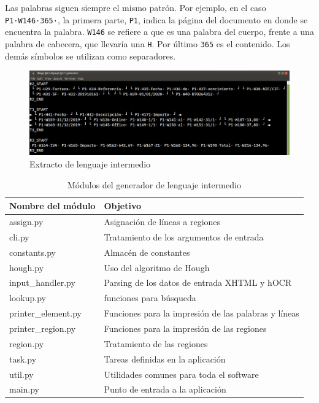 Las palabras siguen siempre el mismo patrón. Por ejemplo, en el caso \verb|P1·W146·365·|, la primera parte, \verb|P1|, indica la página del documento en donde se encuentra la palabra. \verb|W146| se refiere a que es una palabra del cuerpo, frente a una palabra de cabecera, que llevaría una \verb|H|. Por último \verb|365| es el contenido. Los demás símbolos se utilizan como separadores.

\begin{figure}[hp!]
    \centering
    \includegraphics[width=1.0\textwidth]{imaxes/h-implementacion/lenguaje-intermedio.png}
    \caption{Extracto de lenguaje intermedio}
    \label{fig:lenguaje-intermedio}
\end{figure}

\begin{table}[ht]
    \centering
    \begin{tabular}{l l}
        Nombre del módulo & Objetivo \\
        \hline
        \hline
        assign.py & Asignación de líneas a regiones \\
        cli.py & Tratamiento de los argumentos de entrada \\
        constants.py & Almacén de constantes \\
        hough.py & Uso del algoritmo de Hough \\
        input\_handler.py & Parsing de los datos de entrada XHTML y hOCR \\
        lookup.py & funciones para búsqueda \\
        printer\_element.py & Funciones para la impresión de las palabras y líneas \\
        printer\_region.py & Funciones para la impresión de las regiones \\
        region.py & Tratamiento de las regiones \\
        task.py & Tareas definidas en la aplicación \\
        util.py & Utilidades comunes para toda el software \\
        main.py & Punto de entrada a la aplicación \\
    \end{tabular}
    \caption{Módulos del generador de lenguaje intermedio}    
    \label{tab:modulo-generador-codigo-intermedio}
\end{table}


